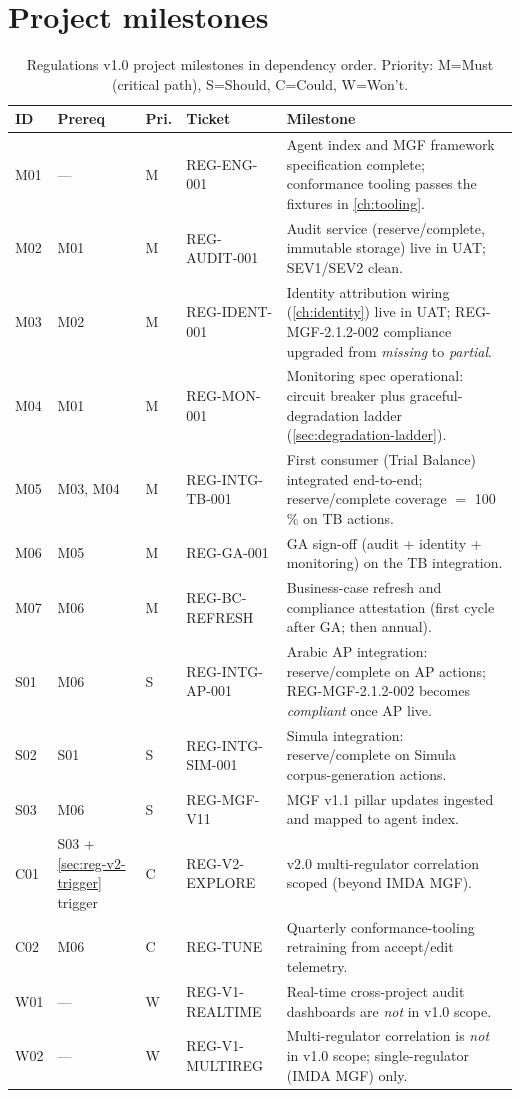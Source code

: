 \documentclass[11pt,a4paper,twoside]{report}
\begin{document}
\section{Project milestones}\label{sec:reg-milestones}

\begin{table}[htbp]
\centering
\caption{Regulations v1.0 project milestones in dependency order.
Priority: M=Must (critical path), S=Should, C=Could, W=Won't.}
\label{tab:reg-milestones}
\footnotesize
\begin{tabularx}{\linewidth}{@{}l l l l X@{}}
\toprule
\textbf{ID} & \textbf{Prereq} & \textbf{Pri.} & \textbf{Ticket} & \textbf{Milestone} \\ \midrule
M01 & ---       & M & REG-ENG-001        & Agent index and MGF framework specification complete; conformance tooling passes the fixtures in \cref{ch:tooling}. \\
M02 & M01       & M & REG-AUDIT-001      & Audit service (reserve/complete, immutable storage) live in UAT; SEV1/SEV2 clean. \\
M03 & M02       & M & REG-IDENT-001      & Identity attribution wiring (\cref{ch:identity}) live in UAT; REG-MGF-2.1.2-002 compliance upgraded from \textit{missing} to \textit{partial}. \\
M04 & M01       & M & REG-MON-001        & Monitoring spec operational: circuit breaker plus graceful-degradation ladder (\cref{sec:degradation-ladder}). \\
M05 & M03, M04  & M & REG-INTG-TB-001    & First consumer (Trial Balance) integrated end-to-end; reserve/complete coverage $=$ 100\,\% on TB actions. \\
M06 & M05       & M & REG-GA-001         & GA sign-off (audit + identity + monitoring) on the TB integration. \\
M07 & M06       & M & REG-BC-REFRESH     & Business-case refresh and compliance attestation (first cycle after GA; then annual). \\
S01 & M06       & S & REG-INTG-AP-001    & Arabic AP integration: reserve/complete on AP actions; REG-MGF-2.1.2-002 becomes \textit{compliant} once AP live. \\
S02 & S01       & S & REG-INTG-SIM-001   & Simula integration: reserve/complete on Simula corpus-generation actions. \\
S03 & M06       & S & REG-MGF-V11        & MGF v1.1 pillar updates ingested and mapped to agent index. \\
C01 & S03 + \cref{sec:reg-v2-trigger} trigger & C & REG-V2-EXPLORE & v2.0 multi-regulator correlation scoped (beyond IMDA MGF). \\
C02 & M06       & C & REG-TUNE           & Quarterly conformance-tooling retraining from accept/edit telemetry. \\
W01 & ---       & W & REG-V1-REALTIME    & Real-time cross-project audit dashboards are \emph{not} in v1.0 scope. \\
W02 & ---       & W & REG-V1-MULTIREG    & Multi-regulator correlation is \emph{not} in v1.0 scope; single-regulator (IMDA MGF) only. \\
\bottomrule
\end{tabularx}
\end{table}
\end{document}
